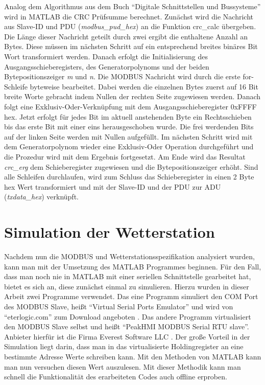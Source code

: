 Analog dem Algorithmus aus dem Buch \enquote{Digitale Schnittstellen und Bussysteme} wird in MATLAB die CRC Prüfsumme berechnet. Zunächst wird die Nachricht aus Slave-ID und PDU (\textit{modbus\_pud\_hex}) an die Funktion \textsf{crc\_calc} übergeben. Die Länge dieser Nachricht geteilt durch zwei ergibt die enthaltene Anzahl an Bytes. Diese müssen im nächsten Schritt auf ein entsprechend breites binäres Bit Wort transformiert werden. Danach erfolgt die Initialisierung des Ausgangsschieberegisters, des Generatorpolynoms und der beiden Bytepositionszeiger \textit{m} und \textit{n}. Die MODBUS Nachricht wird durch die erste for-Schleife byteweise bearbeitet. Dabei werden die einzelnen Bytes zuerst auf 16 Bit breite Worte gebracht indem Nullen der rechten Seite zugewiesen werden. Danach folgt eine Exklusiv-Oder-Verknüpfung mit dem Ausgangsschieberegister 0xFFFF hex. Jetzt erfolgt für jedes Bit im aktuell anstehenden Byte ein Rechtsschieben bis das erste Bit mit einer eins herausgeschoben wurde. Die frei werdenden Bits auf der linken Seite werden mit Nullen aufgefüllt. Im nächsten Schritt wird mit dem Generatorpolynom wieder eine Exklusiv-Oder Operation durchgeführt und die Prozedur wird mit dem Ergebnis fortgesetzt. Am Ende wird das Resultat \textit{crc\_erg} dem Schieberegister zugewiesen und die Bytepositionszeiger erhöht. Sind alle Schleifen durchlaufen, wird zum Schluss das Schieberegister in einen 2 Byte hex Wert transformiert und mit der Slave-ID und der PDU zur ADU (\textit{txdata\_hex}) verknüpft.\cite{Schleicher.2008} 

\section{Simulation der Wetterstation}  
Nachdem nun die MODBUS und Wetterstationsspezifikation analysiert wurden, kann man mit der Umsetzung des MATLAB Programmes beginnen. Für den Fall, dass man noch nie in MATLAB mit einer seriellen Schnittstelle gearbeitet hat, bietet es sich an, diese zunächst einmal zu simulieren. Hierzu wurden in dieser Arbeit zwei Programme verwendet. Das eine Programm simuliert den COM Port des MODBUS Slave, heißt \enquote{Virtual Serial Ports Emulator} und wird von \enquote{eterlogic.com} zum Download angeboten \cite{eterlogic}. Das andere Programm virtualisiert den MODBUS Slave selbst und heißt \enquote{PeakHMI MODBUS Serial RTU slave}. Anbieter hierfür ist die Firma Everest Software LLC \cite{everest}. Der große Vorteil in der Simulation liegt darin, dass man in das virtualisierte Holdingregister an eine bestimmte Adresse Werte schreiben kann. Mit den Methoden von MATLAB kann man nun versuchen diesen Wert auszulesen. Mit dieser Methodik kann man schnell die Funktionalität des erarbeiteten Codes auch offline erproben. 

     
      
